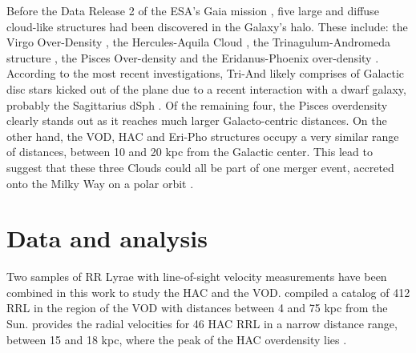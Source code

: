 \documentclass[fleqn,usenatbib]{mnras}
\begin{document}
Before the Data Release 2 \citep[][]{Brown2018} of the ESA's Gaia
mission \citep[][]{Prusti2016}, five large and diffuse cloud-like
structures had been discovered in the Galaxy's halo. These include:
the Virgo Over-Density
\citep[VOD,][]{Vivas2001,Newberg2002,Duffau2006,Juric2008,Bonaca2012},
the Hercules-Aquila Cloud \citep[HAC,][]{Be07,Simion2014}, the
Trinagulum-Andromeda structure
\citep[Tri-And,][]{Rocha2004,Majewski2004,Deason2014}, the Pisces
Over-density \citep[][]{Sesar2007,Wa09,Nie2015} and the
Eridanus-Phoenix over-density \citep[Eri-Pho,][]{Li2016}. According to
the most recent investigations, Tri-And likely comprises of Galactic
disc stars kicked out of the plane due to a recent interaction with a
dwarf galaxy, probably the Sagittarius dSph
\citep[e.g.][]{Pr15,Bergemann2018,Hayes2018}. Of the remaining four,
the Pisces overdensity clearly stands out as it reaches much larger
Galacto-centric distances. On the other hand, the VOD, HAC and Eri-Pho
structures occupy a very similar range of distances, between 10 and 20
kpc from the Galactic center. This lead \citet{Li2016} to suggest that
these three Clouds could all be part of one merger event, accreted
onto the Milky Way on a polar orbit \citep[see also][]{Juric2008}.

\section{Data and analysis}
Two samples of RR Lyrae with line-of-sight velocity measurements have been combined in this work to study the HAC and the VOD. \cite{Vivas2016} compiled a catalog of 412 RRL in the region of the VOD with distances between 4 and 75 kpc from the Sun. \cite{Simion2018} provides the radial velocities for 46 HAC RRL in a narrow distance range, between 15 and 18 kpc, where the peak of the HAC overdensity lies \citet{Simion2014}. 
%
\end{document}
